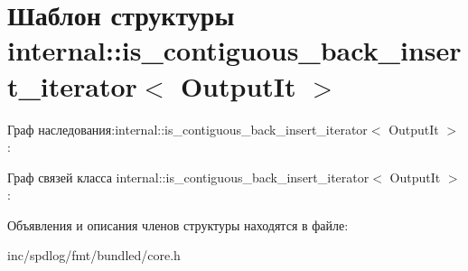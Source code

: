 \hypertarget{structinternal_1_1is__contiguous__back__insert__iterator}{}\section{Шаблон структуры internal\+:\+:is\+\_\+contiguous\+\_\+back\+\_\+insert\+\_\+iterator$<$ Output\+It $>$}
\label{structinternal_1_1is__contiguous__back__insert__iterator}


Граф наследования\+:internal\+:\+:is\+\_\+contiguous\+\_\+back\+\_\+insert\+\_\+iterator$<$ Output\+It $>$\+:


Граф связей класса internal\+:\+:is\+\_\+contiguous\+\_\+back\+\_\+insert\+\_\+iterator$<$ Output\+It $>$\+:


Объявления и описания членов структуры находятся в файле\+:\begin{DoxyCompactItemize}
\item 
inc/spdlog/fmt/bundled/core.\+h\end{DoxyCompactItemize}
